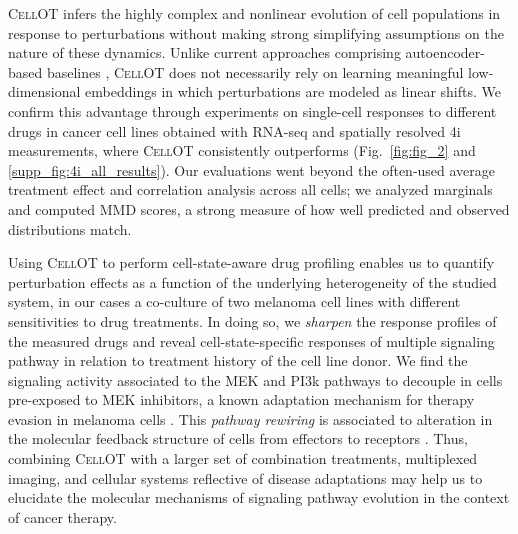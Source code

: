  \textsc{CellOT} infers the highly complex and nonlinear evolution of cell populations in response to perturbations without making strong simplifying assumptions on the nature of these dynamics.
Unlike current approaches comprising autoencoder-based baselines \citep{Lopez2018scvi, lotfollahi2019scgen, yang2020predicting}, \textsc{CellOT} does not necessarily rely on learning meaningful low-dimensional embeddings in which perturbations are modeled as linear shifts. %
We confirm this advantage through experiments on single-cell responses to different drugs in cancer cell lines obtained with RNA-seq and spatially resolved 4i measurements, where \textsc{CellOT} consistently outperforms (Fig.~\ref{fig:fig_2} and \ref{supp_fig:4i_all_results}). Our evaluations went beyond the often-used average treatment effect and correlation analysis across all cells; we analyzed marginals
and computed MMD scores, a strong measure of how well predicted and observed distributions match.

\smallskip

 Using \textsc{CellOT} to perform cell-state-aware drug profiling enables us to quantify perturbation effects as a function of the underlying heterogeneity of the studied system, in our cases a co-culture of two melanoma cell lines with different sensitivities to drug treatments. In doing so, we \textit{sharpen} the response profiles of the measured drugs and reveal cell-state-specific responses of multiple signaling pathway in relation to treatment history of the cell line donor. We find the signaling activity associated to the MEK and PI3k pathways to decouple in cells pre-exposed to MEK inhibitors, a known adaptation mechanism for therapy evasion in melanoma cells \citep{kun2021mek}. This \textit{pathway rewiring} is associated to alteration in the molecular feedback structure of cells from effectors to receptors \citep{kun2021mek, turke2012mek}. Thus, combining \textsc{CellOT} with a larger set of combination treatments, multiplexed imaging, and cellular systems reflective of disease adaptations may help us to elucidate the molecular mechanisms of signaling pathway evolution in the context of cancer therapy. 

\smallskip

